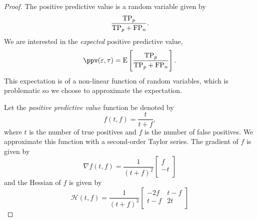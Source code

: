 \begin{proof}
The positive predictive value is a random variable given by
\begin{equation}
    \frac{\mathrm{TP}_p}{\mathrm{TP}_p + \mathrm{FP}_n}.
\end{equation}
We are interested in the \emph{expected} positive predictive value,
\begin{equation}
    \ppv(\fprate,\tprate) = \Expect{\frac{\TP_p}{\TP_p + \FP_n}}.
\end{equation}
This expectation is of a non-linear function of random variables, which is problematic so we choose to approximate the expectation.

Let the \emph{positive predictive value} function be denoted by
\begin{equation}
    f(t, f) = \frac{t}{t + f},
\end{equation}
where $t$ is the number of true positives and $f$ is the number of false positives.
We approximate this function with a second-order Taylor series.
The gradient of $f$ is given by
\begin{equation}
    \nabla f(t,f) =
    \frac{1}{(t + f)^2}
    \begin{bmatrix}
        f\\
        -t\\
    \end{bmatrix}
\end{equation}
and the Hessian of $f$ is given by
\begin{equation}
    \mathcal{H}(t,f) =
    \frac{1}{(t + f)^3}
    \begin{bmatrix}
        -2 f & t-f\\
        t-f & 2 t \\
    \end{bmatrix}
\end{equation}


\end{proof}
